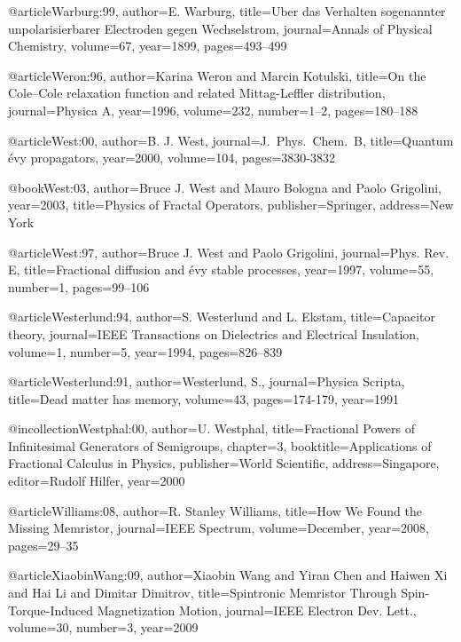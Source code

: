 \begin{thebibliography}{99}
@article{Warburg:99,
  author={E. Warburg},
  title={Uber das {V}erhalten sogenannter unpolarisierbarer {E}lectroden gegen
    {W}echselstrom},
  journal={Annals of Physical Chemistry},
  volume={67},
  year={1899},
  pages={493--499}
}

@article{Weron:96,
  author={Karina Weron and Marcin Kotulski},
  title={On the {C}ole--{C}ole relaxation function and related {M}ittag-{L}effler
    distribution},
  journal={Physica A},
  year={1996},
  volume={232},
  number={1--2},
  pages={180--188}
}

@article{West:00,
  author={B. J. West},
  journal={J.\ Phys.\ Chem.\ B},
  title={Quantum \'evy propagators},
  year={2000},
  volume={104},
  pages={3830-3832}
}

@book{West:03,
  author={Bruce J. West and Mauro Bologna and Paolo Grigolini},
  year={2003},
  title={Physics of Fractal Operators},
  publisher={Springer},
  address={New York}
}

@article{West:97,
  author={Bruce J. West and Paolo Grigolini},
  journal={Phys. Rev. E},
  title={Fractional diffusion and \'evy stable processes},
  year={1997},
  volume={55},
  number={1},
  pages={99--106}
}

@article{Westerlund:94,
  author={S. Westerlund and L. Ekstam},
  title={Capacitor theory},
  journal={IEEE Transactions on Dielectrics and Electrical Insulation},
  volume={1},
  number={5},
  year={1994},
  pages={826--839}
}

@article{Westerlund:91,
  author={Westerlund, S.},
  journal={Physica Scripta},
  title={Dead matter has memory},
  volume={43},
  pages={174-179},
  year={1991}
}

@incollection{Westphal:00,
  author={U. Westphal},
  title={Fractional Powers of Infinitesimal Generators of Semigroups},
  chapter={3},
  booktitle={Applications of Fractional Calculus in Physics},
  publisher={World Scientific},
  address={Singapore},
  editor={Rudolf Hilfer},
  year={2000}
}

@article{Williams:08,
  author={R. Stanley Williams},
  title={How We Found the Missing Memristor},
  journal={IEEE Spectrum},
  volume={December},
  year={2008},
  pages={29--35}
}

@article{XiaobinWang:09,
  author={Xiaobin Wang and Yiran Chen and Haiwen Xi and Hai Li and Dimitar Dimitrov},
  title={Spintronic Memristor Through Spin-Torque-Induced Magnetization Motion},
  journal={IEEE Electron Dev. Lett.},
  volume={30},
  number={3},
  year={2009}
}


\end{thebibliography}
